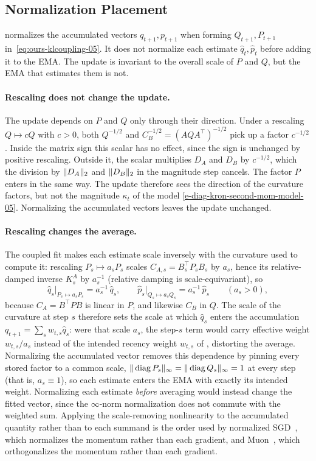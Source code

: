 \subsection{Normalization Placement}
\label{sec:scale-placement-05}

\methodname{} normalizes the accumulated vectors $q_{t+1},p_{t+1}$ when
forming $Q_{t+1},P_{t+1}$ in~\eqref{eq:ours-klcoupling-05}. It does not
normalize each estimate $\hat{q}_t,\hat{p}_t$ before adding it to
the EMA. The update is invariant to the overall scale of $P$ and $Q$, but
the EMA that estimates them is not.

\paragraph{Rescaling does not change the update.}
The update depends on $P$ and $Q$ only through their direction. Under a
rescaling $Q\mapsto cQ$ with $c>0$, both $Q^{-1/2}$ and
$C_B^{-1/2}=(AQA^\top)^{-1/2}$ pick up a factor $c^{-1/2}$. Inside the
matrix sign this scalar has no effect, since the sign is unchanged by
positive rescaling. Outside it, the scalar multiplies $D_A$ and $D_B$ by
$c^{-1/2}$, which the division by $\| D_A\|_2$ and
$\| D_B\|_2$ in the magnitude step cancels. The factor $P$ enters in
the same way. The update therefore sees the direction of the curvature
factors, but not the magnitude $\kappa_t$ of the model
\eqref{e-diag-kron-second-mom-model-05}. Normalizing the accumulated
vectors leaves the update unchanged.

\paragraph{Rescaling changes the average.}
The coupled fit makes each estimate scale inversely with the curvature used to
compute it: rescaling $P_s\mapsto a_sP_s$ scales $C_{A,s}=B_s^\top P_sB_s$ by
$a_s$, hence its relative-damped inverse $K^A_s$ by $a_s^{-1}$ (relative damping
is scale-equivariant), so
\[
  \hat{q}_s\big|_{P_s\mapsto a_sP_s}=a_s^{-1}\,\hat{q}_s,
  \qquad
  \hat{p}_s\big|_{Q_s\mapsto a_sQ_s}=a_s^{-1}\,\hat{p}_s
  \qquad(a_s>0),
\]
because $C_A=B^\top PB$ is linear in $P$, and likewise $C_B$ in $Q$. The scale
of the curvature at step $s$ therefore sets the scale at which $\hat{q}_s$
enters the accumulation $q_{t+1}=\sum_s w_{t,s}\hat{q}_s$: were that scale
$a_s$, the step-$s$ term would carry effective weight $w_{t,s}/a_s$ instead of
the intended recency weight $w_{t,s}$ of , distorting
the average. Normalizing the accumulated vector removes this dependence by
pinning every stored factor to a common scale,
$\| \operatorname{diag} P_s\|_\infty=\| \operatorname{diag} Q_s\|_\infty=1$ at every step (that is,
$a_s\equiv1$), so each estimate enters the EMA with exactly its intended weight.
Normalizing each estimate \emph{before} averaging would instead change the
fitted vector, since the $\infty$-norm normalization does not commute with the
weighted sum. Applying the scale-removing nonlinearity to the accumulated
quantity rather than to each summand is the order used by normalized
SGD~\cite{cutkosky_nigt}, which normalizes the momentum rather than each
gradient, and Muon~\cite{denoise_ortho}, which orthogonalizes the momentum
rather than each gradient.
